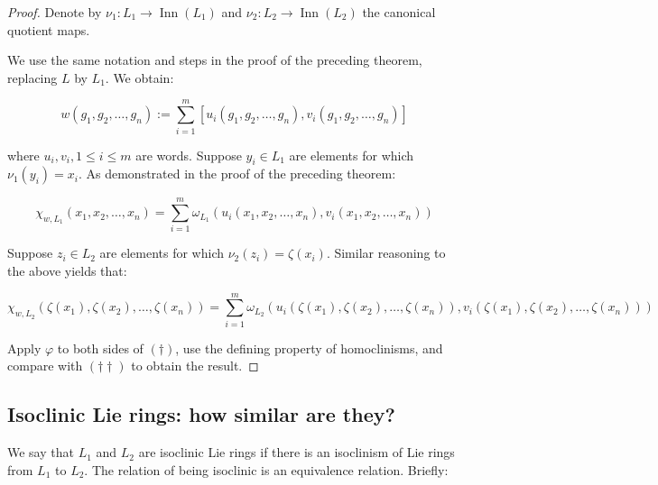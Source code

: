 \begin{proof}
  Denote by $\nu_1:L_1 \to \operatorname{Inn}(L_1)$ and $\nu_2:L_2 \to
  \operatorname{Inn}(L_2)$ the canonical quotient maps.

  We use the same notation and steps in the proof of the preceding
  theorem, replacing $L$ by $L_1$. We obtain:

  $$w(g_1,g_2,\dots,g_n) := \sum_{i=1}^m [u_i(g_1,g_2,\dots,g_n),v_i(g_1,g_2,\dots,g_n)]$$

  where $u_i,v_i, 1 \le i \le m$ are words. Suppose $y_i \in L_1$ are
  elements for which $\nu_1(y_i) = x_i$. As demonstrated in the proof of
  the preceding theorem:

  \begin{equation*}
    \chi_{w,L_1}(x_1,x_2,\dots,x_n) = \sum_{i=1}^m \omega_{L_1}(u_i(x_1,x_2,\dots,x_n),v_i(x_1,x_2,\dots,x_n)) \tag{$\dagger$}
  \end{equation*}

  Suppose $z_i \in L_2$ are elements for which $\nu_2(z_i) =
  \zeta(x_i)$. Similar reasoning to the above yields that:

  \begin{small}
  \begin{equation*}
    \chi_{w,L_2}(\zeta(x_1),\zeta(x_2),\dots,\zeta(x_n)) = \sum_{i=1}^m \omega_{L_2}(u_i(\zeta(x_1),\zeta(x_2),\dots,\zeta(x_n)),v_i(\zeta(x_1),\zeta(x_2),\dots,\zeta(x_n))) \tag{$\dagger\dagger$}
  \end{equation*}
  \end{small}

  Apply $\varphi$ to both sides of $(\dagger)$, use the defining
  property of homoclinisms, and compare with $(\dagger\dagger)$ to
  obtain the result.
\end{proof}

\subsection{Isoclinic Lie rings: how similar are they?}

We say that $L_1$ and $L_2$ are isoclinic Lie rings if there is an
isoclinism of Lie rings from $L_1$ to $L_2$. The relation of being
isoclinic is an equivalence relation. Briefly:


